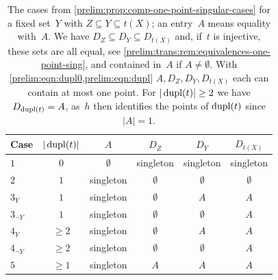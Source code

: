 \begin{table}[htb]
	\centering
	\caption[Cases for composition being a one-point singular]
	{The cases from \cref{prelim:prop:comp-one-point-singular-cases} for a fixed
		set~$Y$ with $Z \subseteq Y \subseteq t(X)$; an entry~$A$ means equality
		with~$A$.
		We have $D_Z \subseteq D_Y \subseteq D_{t(X)}$
		and, if~$t$ is injective, these sets are all equal,
		see \cref{prelim:trans:rem:equivalences-one-point-sing},
		and contained in~$A$ if $A \ne \emptyset$.
		With \cref{prelim:eqn:dupl0,prelim:eqn:dupl} $A,D_Z,D_Y,D_{t(X)}$ each 
		can contain at most one point.
		For $|\operatorname{dupl}(t)| \ge 2$ we have $D_{\operatorname{dupl}(t)} = A$, as~$h$ 
		then identifies the points of $\operatorname{dupl}(t)$ since $|A| = 1$.
	}
	\label{prelim:trans:tab-one-point-singular-cases}
	{\setlength{\tabcolsep}{10pt}
		\renewcommand{\arraystretch}{1.15}
		\begin{tabular}{lccccc}
			Case & $|\operatorname{dupl}(t)|$ & $A$ & $D_Z$ & $D_Y$ & $D_{t(X)}$ \\ \hline
			$1$           & $0$     & $\emptyset$ & singleton   & singleton   & singleton \\
			$2$           & $1$     & singleton   & $\emptyset$ & $\emptyset$ & $\emptyset$ \\
			$3_Y$         & $1$     & singleton   & $\emptyset$ & $A$         & $A$ \\
			$3_{\lnot Y}$ & $1$     & singleton   & $\emptyset$ & $\emptyset$ & $A$ \\
			$4_Y$         & $\ge 2$ & singleton   & $\emptyset$ & $A$         & $A$ \\
			$4_{\lnot Y}$ & $\ge 2$ & singleton   & $\emptyset$ & $\emptyset$ & $A$ \\
			$5$           & $\ge 1$ & singleton   & $A$         & $A$         & $A$
	\end{tabular}}
\end{table}



